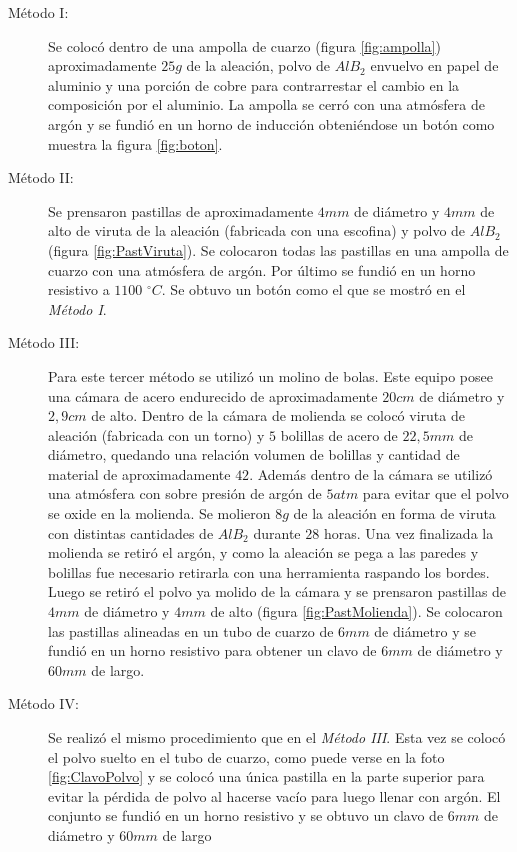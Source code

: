 \documentclass[a4paper,12pt,fleqn,twoside,openany]{book}
\begin{document}
\begin{description}
\item[Método I:] Se colocó dentro de una ampolla de cuarzo (figura \ref{fig:ampolla}) aproximadamente $25 g$ de la aleación, polvo de $AlB_2$ envuelvo en papel de aluminio y una porción de 
cobre para contrarrestar el cambio en la composición por el aluminio. La ampolla se cerró con una atmósfera de argón y se fundió en un horno de inducción obteniéndose un botón como muestra la figura \ref{fig:boton}.

\item[Método II:] Se prensaron pastillas de aproximadamente $4 mm$ de diámetro y $4 mm$ de alto de viruta de la aleación (fabricada con una escofina) y polvo de $AlB_2$ (figura \ref{fig:PastViruta}). Se 
colocaron todas las pastillas en una ampolla de cuarzo con una atmósfera de argón. Por último se fundió en un horno resistivo a $1100$ $^\circ C$. Se obtuvo un botón como el que se mostró en el \textsl{Método I}.

\item[Método III:] Para este tercer método se utilizó un molino de bolas. Este equipo posee una cámara de acero endurecido de aproximadamente $20 cm$ de diámetro y $2,9 cm$ de alto. Dentro de la cámara de molienda se colocó viruta de aleación (fabricada con un torno) y $5$ bolillas de acero de $22,5 mm$ de diámetro, quedando una relación volumen de bolillas y cantidad de material de aproximadamente $42$. Además dentro de la cámara se utilizó una atmósfera con sobre presión de argón de $5 atm$ para evitar que el polvo se oxide en la molienda.
Se molieron $8g$ de la aleación en forma de viruta con distintas cantidades de $AlB_2$ durante $28$ horas.  Una vez finalizada la molienda se retiró el argón, y 
como la aleación se pega a las paredes y bolillas fue necesario retirarla con una herramienta raspando los bordes.
Luego se retiró el polvo ya molido de la cámara y se prensaron pastillas de $4mm$ de diámetro y $4mm$ de alto (figura \ref{fig:PastMolienda}). Se colocaron las pastillas alineadas en un tubo de cuarzo de $6 mm$ de diámetro y se fundió en un horno resistivo para obtener un clavo de $6 mm$ de diámetro y $60 mm$ de largo.

\item[Método IV:] Se realizó el mismo procedimiento que en el \textsl{Método III}. Esta vez se colocó el polvo suelto en el tubo de cuarzo, como puede verse en la foto \ref{fig:ClavoPolvo} y se colocó una única pastilla en la parte superior para evitar la pérdida de polvo al hacerse vacío para luego llenar con argón. El conjunto se fundió en un horno resistivo y se obtuvo un clavo de $6 mm$ de diámetro y $60 mm$ de largo 
\end{description}
\end{document}
